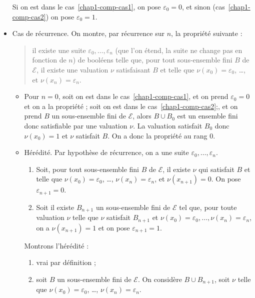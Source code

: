 \documentclass[./main]{subfiles}
\begin{document}
\begin{prv}
\begin{itemize}
        Si on est dans le cas~\ref{chap1-comp-cas1}, on pose $\varepsilon_0 = 0$, et sinon (cas~\ref{chap1-comp-cas2}) on pose $\varepsilon_0 = 1$.
      \item Cas de récurrence.
        On montre, par récurrence sur $n$, la propriété suivante :
        \begin{quote}
          il existe une suite $\varepsilon_0, \ldots, \varepsilon_n$ (que l'on étend, la suite ne change pas en fonction de $n$) de booléens telle que, pour tout sous-ensemble fini $B$ de $\mathcal{E}$, il existe une valuation $\nu$ satisfaisant  $B$ et telle que $\nu(x_0) = \varepsilon_0$, \ldots, et $\nu(x_n) = \varepsilon_n$.
        \end{quote}
        \begin{itemize}
          \item Pour $n = 0$, soit on est dans le cas~\ref{chap1-comp-cas1}, et on prend $\varepsilon_0 = 0$ et on a la propriété ; soit on est dans le cas~\ref{chap1-comp-cas2};, et on prend $B$ un sous-ensemble fini de $\mathcal{E}$, alors $B \cup B_0$ est un ensemble fini donc satisfiable par une valuation $\nu$. La valuation satisfait  $B_0$ donc  $\nu(x_0) = 1$ et $\nu$ satisfait $B$.
            On a donc la propriété au rang $0$.
          \item Hérédité.
            Par hypothèse de récurrence, on a une suite $\varepsilon_0, \ldots, \varepsilon_n$.
            \begin{enumerate}
              \item Soit, pour tout sous-ensemble fini $B$ de $\mathcal{E}$, il existe $\nu$ qui satisfait $B$ et telle que $\nu(x_0) = \varepsilon_0$,  \ldots, $\nu(x_n) = \varepsilon_n$, et  $\nu(x_{n+1}) = 0$. On pose $\varepsilon_{n+1} = 0$.
              \item Soit il existe $B_{n+1}$ un sous-ensemble fini de $\mathcal{E}$ tel que, pour toute valuation $\nu$ telle que $\nu$ satisfait $B_{n+1}$ et $\nu(x_0) = \varepsilon_0, \ldots, \nu(x_n) = \varepsilon_n$, on a $\nu(x_{n+1}) = 1$ et on pose $\varepsilon_{n+1} = 1$.
            \end{enumerate}
            Montrons l'hérédité :
            \begin{enumerate}
              \item vrai par définition ;
              \item soit $B$ un sous-ensemble fini de $\mathcal{E}$. On considère $B \cup B_{n+1}$, soit $\nu$ telle que  $\nu(x_0) = \varepsilon_0$, \ldots, $\nu(x_n) = \varepsilon_n$.

\end{enumerate}
\end{itemize}
\end{itemize}
\end{prv}
\end{document}
